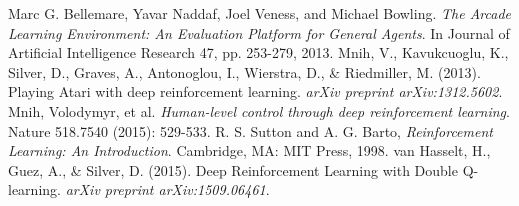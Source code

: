 \documentclass{article}
\begin{document}
\begin{thebibliography}{1}
 Marc G. Bellemare, Yavar Naddaf, Joel Veness, and Michael Bowling. {\em The Arcade Learning Environment: An Evaluation Platform for General Agents}. In Journal of Artificial Intelligence Research 47, pp. 253-279, 2013.
 Mnih, V., Kavukcuoglu, K., Silver, D., Graves, A., Antonoglou, I., Wierstra, D., \& Riedmiller, M. (2013). Playing Atari with deep reinforcement learning. \textit{arXiv preprint arXiv:1312.5602}.
 Mnih, Volodymyr, et al. {\em Human-level control through deep reinforcement learning}. Nature 518.7540 (2015): 529-533.
 R. S. Sutton and A. G. Barto, {\em Reinforcement Learning: An Introduction}. Cambridge, MA: MIT Press, 1998.
 van Hasselt, H., Guez, A., \& Silver, D. (2015). Deep Reinforcement Learning with Double Q-learning. \textit{arXiv preprint arXiv:1509.06461}.
\end{thebibliography}



\pagebreak
\end{document}

